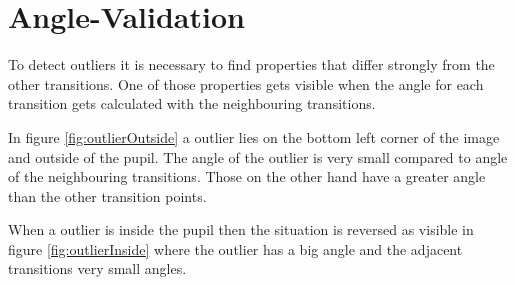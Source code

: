 \section{Angle-Validation}
\label{sec:angleValidation}
To detect outliers it is necessary to find properties that differ strongly from the other transitions. One of those properties gets visible when the angle for each transition gets calculated with the neighbouring transitions. 

In figure \ref{fig:outlierOutside} a outlier lies on the bottom left corner of the image and outside of the pupil. The angle of the outlier is very small compared to angle of the neighbouring transitions. Those on the other hand have a greater angle than the other transition points. 

When a outlier is inside the pupil then the situation is reversed as visible in figure \ref{fig:outlierInside} where the outlier has a big angle and the adjacent transitions very small angles. 

